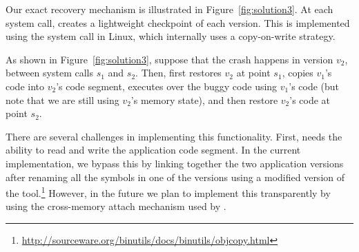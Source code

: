 



Our exact recovery mechanism is illustrated in
Figure~\ref{fig:solution3}.  At each system call, \mx creates a
lightweight checkpoint of each version.  This is implemented using the
 system call in Linux, which internally uses a
copy-on-write strategy.  

As shown in Figure~\ref{fig:solution3}, suppose that the crash happens
in version $v_2$, between system calls $s_1$ and $s_2$.  Then, \rem
first restores $v_2$ at point $s_1$, copies $v_1$'s code into $v_2$'s
code segment, executes over the buggy code using $v_1$'s code (but
note that we are still using $v_2$'s memory state), and then restore
$v_2$'s code at point $s_2$.

There are several challenges in implementing this functionality.
First, \rem needs the ability to read and write the application code
segment.  In the current implementation, we bypass this by linking
together the two application versions after renaming all the symbols
in one of the versions using a modified version of
the 
tool.\footnote{\url{http://sourceware.org/binutils/docs/binutils/objcopy.html}}
However, in the future we plan to implement this transparently by
using the cross-memory attach mechanism used by \mxm.

